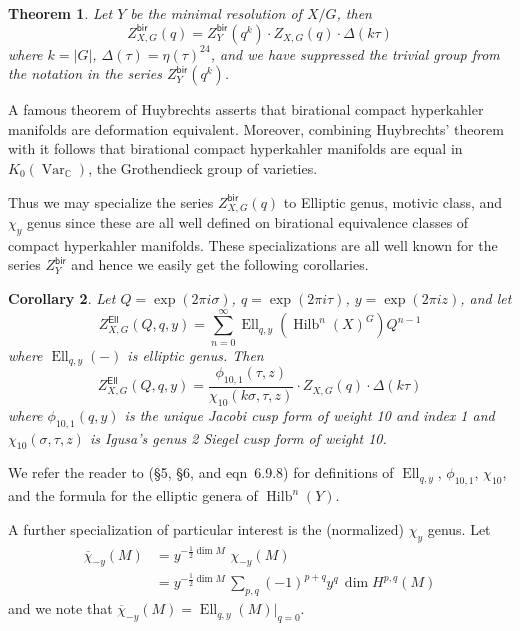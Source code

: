 \documentclass{amsart}
\newtheorem{theorem}{Theorem}[section]
\newtheorem{corollary}[theorem]{Corollary}
\theoremstyle{definition}
\newcommand{\half}{\frac{1}{2}}
\newcommand{\CC} {{\mathbb C}}          %
\newcommand{\bir}{\mathsf{bir}}
\newcommand{\Ell}{\mathsf{Ell}}
\newcommand{\Ellqy}{\operatorname{Ell}_{q,y}}
\newcommand{\chibar}{\overline{\chi}}
\newcommand{\Hilb}{\operatorname{Hilb}}
\begin{document}
\begin{theorem}\label{thm: Formula for Zbir}
Let $Y$ be the minimal resolution of $X/G$, then
\[
Z^{\bir}_{X,G} (q) = Z^{\bir}_{Y}(q^{k})\cdot Z_{X,G}(q)\cdot \Delta (k\tau )
\]
where $k=|G|$, $\Delta (\tau ) = \eta (\tau )^{24}$, and we have
suppressed the trivial group from the notation in the series
$Z^{\bir}_{Y}(q^{k})$.
\end{theorem}

A famous theorem of Huybrechts \cite[Thm~4.6]{Huybrechts} asserts that
birational compact hyperkahler manifolds are deformation
equivalent. Moreover, combining Huybrechts' theorem with
\cite[Prop~3.21]{Nicaise-Shinder} it follows that birational compact
hyperkahler manifolds are equal in $K_{0}(\operatorname{Var}_{\CC})$,
the Grothendieck group of varieties.

Thus we may specialize the series $Z^{\bir}_{X,G}(q)$ to Elliptic
genus, motivic class, and $\chi_{y}$ genus since these are all well
defined on birational equivalence classes of compact hyperkahler
manifolds. These specializations are all well known for the series
$Z^{\bir}_{Y}$ and hence we easily get the following corollaries.

\begin{corollary}\label{cor: Zell formula}
Let $Q=\exp\left(2\pi i\sigma \right)$, $q=\exp\left(2\pi i \tau 
\right)$, $y=\exp\left(2\pi i z
\right)$, and let
\[
Z^{\Ell}_{X,G}(Q,q,y) = \sum_{n=0}^{\infty} \Ellqy
\left(\Hilb^{n}(X)^{G} \right) Q^{n-1}
\]
where $\Ellqy (-)$ is elliptic genus. Then
\[
Z^{\Ell}_{X,G}(Q,q,y) = \frac{\phi_{10,1}(\tau  ,z)}{\chi_{10}(k\sigma
,\tau ,z)} \cdot Z_{X,G}(q)\cdot \Delta (k\tau )
\]
where $\phi_{10,1}(q ,y)$ is the unique Jacobi cusp form of weight
10 and index 1 and $\chi_{10}(\sigma ,\tau ,z)$ is Igusa's genus 2
Siegel cusp form of weight 10. 
\end{corollary}
We refer the reader to \cite{Pietromonaco_2018} (\S 5, \S 6, and
eqn~6.9.8) for definitions of $\Ellqy$, $\phi_{10,1}$, $\chi_{10}$,
and the formula for the elliptic genera of $\Hilb^{n}(Y)$.

A further specialization of particular interest is the (normalized)
$\chi_{y}$ genus. Let 
\begin{align*}
\chibar_{-y}(M) &= y^{-\half \dim
M}\,\, \chi_{-y}(M)\\
& =  y^{-\half \dim
M} \,\sum_{p,q} (-1)^{p+q} y^{q} \, \dim H^{p,q}(M)
\end{align*}
and we note that $\chibar_{-y}(M) = \Ellqy
(M)|_{q=0}$.
\end{document}
